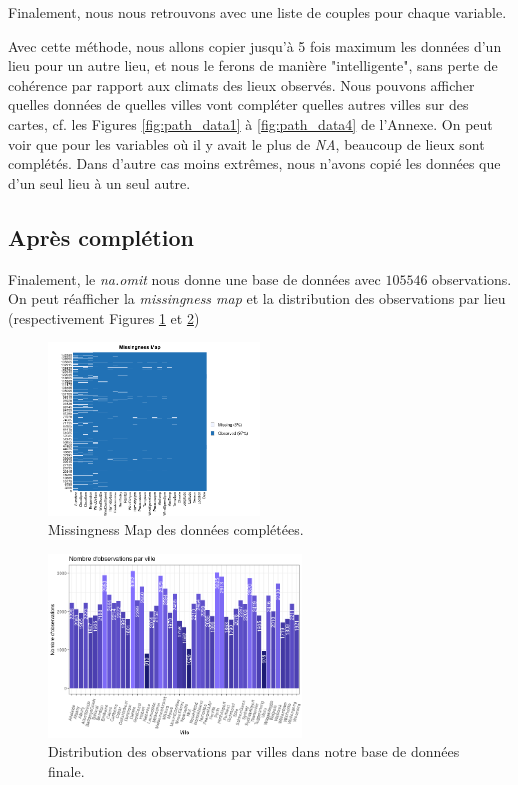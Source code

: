 \documentclass{article}
\begin{document}
Finalement, nous nous retrouvons avec une liste de couples pour chaque variable.

Avec cette méthode, nous allons copier jusqu'à 5 fois maximum les données d'un lieu pour un autre lieu, et nous le ferons de manière "intelligente", sans perte de cohérence par rapport aux climats des lieux observés. Nous pouvons afficher quelles données de quelles villes vont compléter quelles autres villes sur des cartes, cf. les Figures \ref{fig:path_data1} à \ref{fig:path_data4} de l'Annexe. On peut voir que pour les variables où il y avait le plus de \emph{NA}, beaucoup de lieux sont complétés. Dans d'autre cas moins extrêmes, nous n'avons copié les données que d'un seul lieu à un seul autre. 


\subsection{Après complétion}

Finalement, le \emph{na.omit} nous donne une base de données avec $105546$ observations. On peut réafficher la \emph{missingness map} et la distribution des observations par lieu (respectivement Figures \ref{fig:missingness_completed} et \ref{fig:distrib_completed})

\begin{figure}[htp]
    \centering
    \includegraphics[width=0.5\textwidth]{Images/missmap_completed.png}
    \caption{Missingness Map des données complétées.}
    \label{fig:missingness_completed}
\end{figure}

\begin{figure}[htp]
    \centering
    \includegraphics[width=0.6\textwidth]{Images/distribution_lieux_completed.png}
    \caption{Distribution des observations par villes dans notre base de données finale.}
    \label{fig:distrib_completed}
\end{figure}
\end{document}
